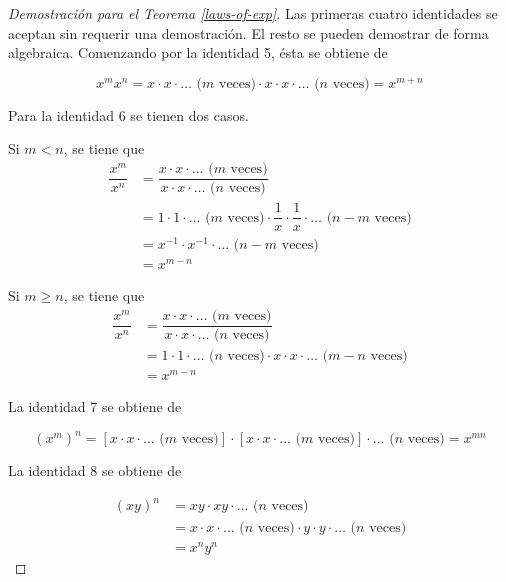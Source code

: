 \begin{proof}[Demostración para el Teorema \ref{laws-of-exp}]
    Las primeras cuatro identidades se aceptan sin requerir una demostración.
    El resto se pueden demostrar de forma algebraica. Comenzando por la
    identidad 5, ésta se obtiene de
    
    \[
    x^{m}x^{n}=x\cdot x\cdot\dots\text{ (}m\text{ veces)}\cdot x\cdot x\cdot\dots\text{ (}n\text{ veces)}=x^{m+n}
    \]
    
    Para la identidad 6 se tienen dos casos.
    \begin{casenv}
        \item Si $m<n$, se tiene que
        \begin{align*}
            \dfrac{x^{m}}{x^{n}} &= \dfrac{x\cdot x\cdot\dots\text{ (}m\text{ veces)}}{x\cdot x\cdot\dots\text{ (}n\text{ veces)}}\\
            &= 1\cdot1\cdot\dots\text{ (}m\text{ veces)}\cdot\dfrac{1}{x}\cdot\dfrac{1}{x}\cdot\dots\text{ (}n-m\text{ veces)}\\
            &= x^{-1}\cdot x^{-1}\cdot\dots\text{ (}n-m\text{ veces)}\\
            &= x^{m-n}
        \end{align*}
        \item Si $m\geq n$, se tiene que
        \begin{align*}
            \dfrac{x^{m}}{x^{n}} &= \dfrac{x\cdot x\cdot\dots\text{ (}m\text{ veces)}}{x\cdot x\cdot\dots\text{ (}n\text{ veces)}}\\
            &= 1\cdot1\cdot\dots\text{ (}n\text{ veces)}\cdot x\cdot x\cdot\dots\text{ (}m-n\text{ veces)}\\
            &= x^{m-n}
        \end{align*}
    \end{casenv}
    
    La identidad 7 se obtiene de
    
    \[
    \left(x^{m}\right)^{n}=\left[x\cdot x\cdot\dots\text{ (}m\text{ veces)}\right]\cdot\left[x\cdot x\cdot\dots\text{ (}m\text{ veces)}\right]\cdot\dots\text{ (}n\text{ veces)}=x^{mn}
    \]
    
    La identidad 8 se obtiene de
    
    \begin{align*}
        \left(xy\right)^{n} &=xy\cdot xy\cdot\dots\text{ (}n\text{ veces)}\\
        &= x\cdot x\cdot\dots\text{ (}n\text{ veces)}\cdot y\cdot y\cdot\dots\text{ (}n\text{ veces)}\\
        &= x^{n}y^{n}
    \end{align*}
    

\end{proof}
